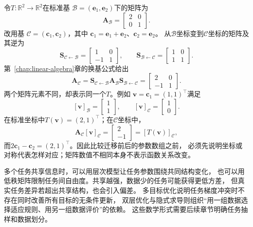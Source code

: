 \begin{example}[同一映射的两组坐标表达]
  \label{ex:future-same-map-two-coordinates}
  令\(T:\mathbb{R}^2\to\mathbb{R}^2\)在标准基
  \(\mathcal B=(\bm e_1,\bm e_2)\)下的矩阵为
  \[
    \bm A_{\mathcal B}
    =
    \begin{bmatrix}
      2&0\\
      0&1
    \end{bmatrix}.
  \]
  改用基
  \(\mathcal C=(\bm c_1,\bm c_2)\)，其中
  \(\bm c_1=\bm e_1+\bm e_2\)、\(\bm c_2=\bm e_2\)。
  从\(\mathcal B\)坐标变到\(\mathcal C\)坐标的矩阵及其逆为
  \[
    \bm S_{\mathcal C\leftarrow\mathcal B}
    =
    \begin{bmatrix}
      1&0\\
      -1&1
    \end{bmatrix},
    \qquad
    \bm S_{\mathcal B\leftarrow\mathcal C}
    =
    \begin{bmatrix}
      1&0\\
      1&1
    \end{bmatrix}.
  \]
  第~\ref{chap:linear-algebra}章的换基公式给出
  \[
    \bm A_{\mathcal C}
    =
    \bm S_{\mathcal C\leftarrow\mathcal B}
    \bm A_{\mathcal B}
    \bm S_{\mathcal B\leftarrow\mathcal C}
    =
    \begin{bmatrix}
      2&0\\
      -1&1
    \end{bmatrix}.
  \]
  两个矩阵元素不同，却表示同一个\(T\)。例如
  \(\bm v=\bm c_1=(1,1)^{\top}\)满足
  \[
    [\bm v]_{\mathcal B}
    =
    \begin{bmatrix}1\\1\end{bmatrix},
    \qquad
    [\bm v]_{\mathcal C}
    =
    \begin{bmatrix}1\\0\end{bmatrix}.
  \]
  在标准坐标中\(T(\bm v)=(2,1)^{\top}\)；在\(\mathcal C\)坐标中，
  \[
    \bm A_{\mathcal C}[\bm v]_{\mathcal C}
    =
    \begin{bmatrix}2\\-1\end{bmatrix}
    =
    [T(\bm v)]_{\mathcal C},
  \]
  而\(2\bm c_1-\bm c_2=(2,1)^{\top}\)。因此比较迁移前后的参数数组之前，
  必须先说明坐标或对称代表怎样对应；矩阵数值不相同本身不表示函数关系改变。
\end{example}

多个任务共享信息时，可以用层次模型让任务参数围绕共同结构变化，
也可以用低秩矩阵限制任务间自由度。共享越强，数据少的任务可能获得更低方差，
但真实任务差异若超出共享结构，也会引入偏差。
多目标优化说明任务梯度冲突时不存在同时改善所有目标的无条件更新，
双层优化与隐式求导则组织“用一组数据选择适应规则、用另一组数据评价”的依赖。
这些数学形式需要后续章节明确任务抽样和数据划分。

